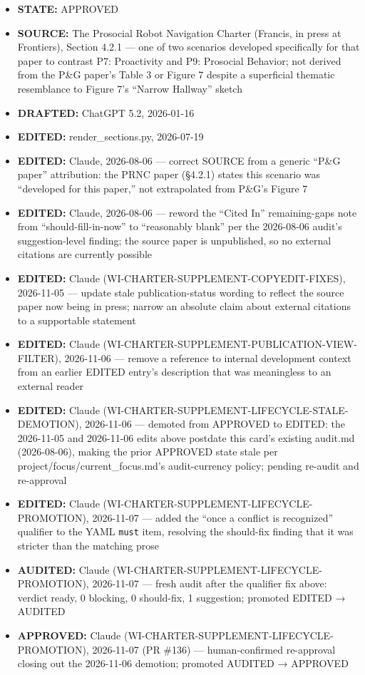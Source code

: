 \documentclass[utf8]{frontiers_suppmat} %
\providecommand{\tightlist}{%
  \setlength{\itemsep}{0pt}\setlength{\parskip}{0pt}}
\begin{document}
\begin{itemize}
\tightlist
\item
  \textbf{STATE:} APPROVED
\item
  \textbf{SOURCE:} The Prosocial Robot Navigation Charter (Francis, in
  press at Frontiers), Section 4.2.1 --- one of two scenarios developed
  specifically for that paper to contrast P7: Proactivity and P9:
  Prosocial Behavior; not derived from the P\&G paper's Table 3 or
  Figure 7 despite a superficial thematic resemblance to Figure 7's
  ``Narrow Hallway'' sketch
\item
  \textbf{DRAFTED:} ChatGPT 5.2, 2026-01-16
\item
  \textbf{EDITED:} render\_sections.py, 2026-07-19
\item
  \textbf{EDITED:} Claude, 2026-08-06 --- correct SOURCE from a generic
  ``P\&G paper'' attribution: the PRNC paper (§4.2.1) states this
  scenario was ``developed for this paper,'' not extrapolated from
  P\&G's Figure 7
\item
  \textbf{EDITED:} Claude, 2026-08-06 --- reword the ``Cited In''
  remaining-gaps note from ``should-fill-in-now'' to ``reasonably
  blank'' per the 2026-08-06 audit's suggestion-level finding; the
  source paper is unpublished, so no external citations are currently
  possible
\item
  \textbf{EDITED:} Claude (WI-CHARTER-SUPPLEMENT-COPYEDIT-FIXES),
  2026-11-05 --- update stale publication-status wording to reflect the
  source paper now being in press; narrow an absolute claim about
  external citations to a supportable statement
\item
  \textbf{EDITED:} Claude
  (WI-CHARTER-SUPPLEMENT-PUBLICATION-VIEW-FILTER), 2026-11-06 --- remove
  a reference to internal development context from an earlier EDITED
  entry's description that was meaningless to an external reader
\item
  \textbf{EDITED:} Claude
  (WI-CHARTER-SUPPLEMENT-LIFECYCLE-STALE-DEMOTION), 2026-11-06 ---
  demoted from APPROVED to EDITED: the 2026-11-05 and 2026-11-06 edits
  above postdate this card's existing audit.md (2026-08-06), making the
  prior APPROVED state stale per project/focus/current\_focus.md's
  audit-currency policy; pending re-audit and re-approval
\item
  \textbf{EDITED:} Claude (WI-CHARTER-SUPPLEMENT-LIFECYCLE-PROMOTION),
  2026-11-07 --- added the ``once a conflict is recognized'' qualifier
  to the YAML \texttt{must} item, resolving the
  should-fix finding that it was stricter than the matching prose
\item
  \textbf{AUDITED:} Claude (WI-CHARTER-SUPPLEMENT-LIFECYCLE-PROMOTION),
  2026-11-07 --- fresh audit after the qualifier fix above: verdict
  ready, 0 blocking, 0 should-fix, 1 suggestion; promoted EDITED →
  AUDITED
\item
  \textbf{APPROVED:} Claude (WI-CHARTER-SUPPLEMENT-LIFECYCLE-PROMOTION),
  2026-11-07 (PR \#136) --- human-confirmed re-approval closing out the
  2026-11-06 demotion; promoted AUDITED → APPROVED
\end{itemize}
\end{document}
